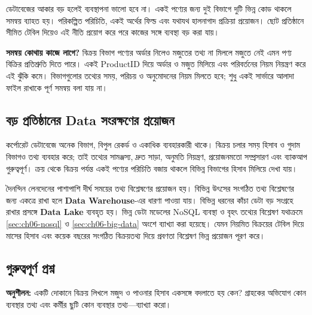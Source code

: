 ডেটাবেজের আকার বড় হলেই ব্যবস্থাপনা ভালো হবে না। একই পণ্যের জন্য দুই বিভাগে দুটি ভিন্ন কোড থাকলে সমন্বয় ব্যাহত হয়। পরিকল্পিত পরিচিতি, একই অর্থের ফিল্ড এবং যথাযথ হালনাগাদ প্রক্রিয়া প্রয়োজন। ছোট প্রতিষ্ঠানে সীমিত টেবিল দিয়েও এই নীতি প্রয়োগ করে পরে কাজের সঙ্গে ব্যবস্থা বড় করা যায়।


\textbf{সমন্বয় কোথায় কাজে লাগে?} বিক্রয় বিভাগ পণ্যের অর্ডার নিলেও মজুতের তথ্য না মিললে মজুতে নেই এমন পণ্য বিক্রির প্রতিশ্রুতি দিতে পারে। একই ProductID দিয়ে অর্ডার ও মজুত মিলিয়ে এবং পরিবর্তনের নিয়ম নিয়ন্ত্রণ করে এই ঝুঁকি কমে। বিভাগগুলোর তথ্যের সময়, পরিচয় ও অনুমোদনের নিয়ম মিলতে হবে; শুধু একই সার্ভারে আলাদা ফাইল রাখাকে পূর্ণ সমন্বয় বলা যায় না।

\subsection{বড় প্রতিষ্ঠানের Data সংরক্ষণের প্রয়োজন}
কর্পোরেট ডেটাবেজে অনেক বিভাগ, বিপুল রেকর্ড ও একাধিক ব্যবহারকারী থাকে। বিক্রয় চলার সময় হিসাব ও গুদাম বিভাগও তথ্য ব্যবহার করে; তাই তথ্যের সামঞ্জস্য, দ্রুত সাড়া, অনুমতি নিয়ন্ত্রণ, প্রয়োজনমতো সম্প্রসারণ এবং ব্যাকআপ গুরুত্বপূর্ণ। ক্রয় থেকে বিক্রয় পর্যন্ত একই পণ্যের পরিচিতি বজায় থাকলে বিভিন্ন বিভাগের হিসাব মিলিয়ে দেখা যায়।

দৈনন্দিন লেনদেনের পাশাপাশি দীর্ঘ সময়ের তথ্য বিশ্লেষণের প্রয়োজন হয়। বিভিন্ন উৎসের সংগঠিত তথ্য বিশ্লেষণের জন্য একত্রে রাখা হলে \textbf{Data Warehouse}-এর ধারণা পাওয়া যায়। বিভিন্ন ধরনের কাঁচা ডেটা বড় সংগ্রহে রাখার প্রসঙ্গে \textbf{Data Lake} ব্যবহৃত হয়। ভিন্ন ডেটা মডেলের NoSQL ব্যবস্থা ও বৃহৎ তথ্যের বিশ্লেষণ যথাক্রমে \ref{sec:ch06-nosql} ও \ref{sec:ch06-big-data} অংশে ব্যাখ্যা করা হয়েছে। যেমন নিয়মিত বিক্রয়ের টেবিল দিয়ে মাসের হিসাব এবং কয়েক বছরের সংগঠিত বিক্রয়তথ্য দিয়ে প্রবণতা বিশ্লেষণ ভিন্ন প্রয়োজন পূরণ করে।

\subsection{গুরুত্বপূর্ণ প্রশ্ন}
\textbf{অনুশীলন:} একটি দোকানে বিক্রয় লিখলে মজুদ ও পাওনার হিসাব একসঙ্গে বদলাতে হয় কেন? গ্রাহকের অভিযোগ কোন ব্যবস্থার তথ্য এবং কর্মীর ছুটি কোন ব্যবস্থার তথ্য---ব্যাখ্যা করো।


